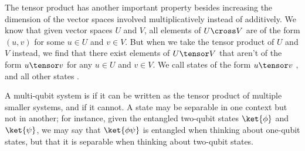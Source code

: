 The tensor product has another important property besides increasing the
dimension of the vector spaces involved multiplicatively instead of additively.
We know that given vector spaces $U$ and $V$, all elements of $U \cross V$ are
of the form $(u,v)$ for some $u \in U$ and $v \in V$.  But when we take the
tensor product of $U$ and $V$ instead, we find that there exist elements of $U
\tensor V$ that aren't of the form $u \tensor v$ for any $u \in U$ and $v \in
V$.  We call states of the form $u \tensor v$ , and all other
states .

\begin{definition}%
\label{def:separable-entangled}
  A multi-qubit system is  if it can be written as the tensor
  product of multiple smaller systems, and  if it cannot.  A
  state may be separable in one context but not in another; for instance, given
  the entangled two-qubit states $\ket{\phi}$ and $\ket{\psi}$, we may say that
  $\ket{\phi\psi}$ is entangled when thinking about one-qubit states, but that
  it is separable when thinking about two-qubit states.
\end{definition}

